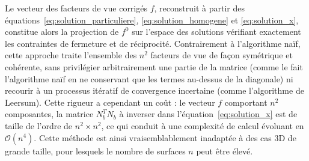 Le vecteur des facteurs de vue corrigés $f$, reconstruit à partir des équations~\eqref{eq:solution_particuliere}, \eqref{eq:solution_homogene} et \eqref{eq:solution_x}, constitue alors la projection de $f^0$ sur l'espace des solutions vérifiant exactement les contraintes de fermeture et de réciprocité. Contrairement à l'algorithme naïf, cette approche traite l'ensemble des $n^2$ facteurs de vue de façon symétrique et cohérente, sans privilégier arbitrairement une partie de la matrice (comme le fait l'algorithme naïf en ne conservant que les termes au-dessus de la diagonale) ni recourir à un processus itératif de convergence incertaine (comme l'algorithme de Leersum). Cette rigueur a cependant un coût : le vecteur $f$ comportant $n^2$ composantes, la matrice $N_b^T N_b$ à inverser dans l'équation~\eqref{eq:solution_x} est de taille de l'ordre de $n^2 \times n^2$, ce qui conduit à une complexité de calcul évoluant en $\mathcal{O}(n^4)$. Cette méthode est ainsi vraisemblablement inadaptée à des cas 3D de grande taille, pour lesquels le nombre de surfaces $n$ peut être élevé.





